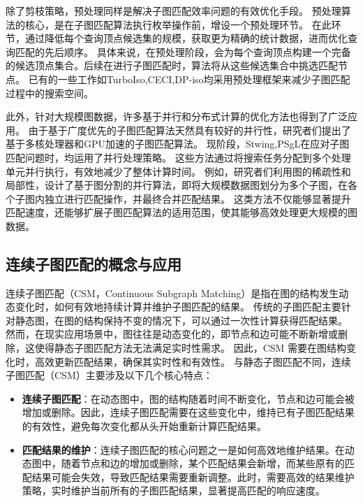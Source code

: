 除了剪枝策略，预处理同样是解决子图匹配效率问题的有效优化手段。 
预处理算法的核心，是在子图匹配算法执行枚举操作前，增设一个预处理环节。
在此环节，通过降低每个查询顶点候选集的规模，获取更为精确的统计数据，进而优化查询匹配的先后顺序。
具体来说，在预处理阶段，会为每个查询顶点构建一个完备的候选顶点集合。后续在进行子图匹配时，算法将从这些候选集合中挑选匹配节点。
已有的一些工作如TurboIso\cite{sm-turbo-iso-DBLP:conf/sigmod/HanLL13},CECI\cite{sm-ceci-DBLP:conf/sigmod/BhattaraiLH19},DP-iso\cite{sm-dp-iso-DBLP:conf/sigmod/HanKGPH19}均采用预处理框架来减少子图匹配过程中的搜索空间。

此外，针对大规模图数据，许多基于并行和分布式计算的优化方法也得到了广泛应用。
由于基于广度优先的子图匹配算法天然具有较好的并行性，研究者们提出了基于多核处理器和GPU加速的子图匹配算法。
现阶段，Stwing\cite{sm-stwing-DBLP:journals/pvldb/SunWWSL12},PSgL\cite{sm-psgl-DBLP:conf/sigmod/ShaoCCMYX14}在应对子图匹配问题时，均运用了并行处理策略。
这些方法通过将搜索任务分配到多个处理单元并行执行，有效地减少了整体计算时间。
例如，研究者们利用图的稀疏性和局部性，设计了基于图分割的并行算法，即将大规模数据图划分为多个子图，在各个子图内独立进行匹配操作，并最终合并匹配结果。
这类方法不仅能够显著提升匹配速度，还能够扩展子图匹配算法的适用范围，使其能够高效处理更大规模的图数据。


\subsection{连续子图匹配的概念与应用}
连续子图匹配（CSM，Continuous Subgraph Matching）是指在图的结构发生动态变化时，如何有效地持续计算并维护子图匹配的结果\cite{wang2023survey}。
传统的子图匹配主要针对静态图，在图的结构保持不变的情况下，可以通过一次性计算获得匹配结果。
然而，在现实应用场景中，图往往是动态变化的，即节点和边可能不断新增或删除，这使得静态子图匹配方法无法满足实时性需求。
因此，CSM 需要在图结构变化时，高效更新匹配结果，确保其实时性和有效性。
与静态子图匹配不同，连续子图匹配（CSM）主要涉及以下几个核心特点：
\begin{itemize}
   \item \textbf{连续子图匹配}：在动态图中，图的结构随着时间不断变化，节点和边可能会被增加或删除。因此，连续子图匹配需要在这些变化中，维持已有子图匹配结果的有效性，避免每次变化都从头开始重新计算匹配结果。
   \item \textbf{匹配结果的维护}：连续子图匹配的核心问题之一是如何高效地维护结果。在动态图中，随着节点和边的增加或删除，某个匹配结果会新增，而某些原有的匹配结果可能会失效，导致匹配结果需要重新调整。此时，需要高效的结果维护策略，实时维护当前所有的子图匹配结果，显著提高匹配的响应速度。
\end{itemize}

